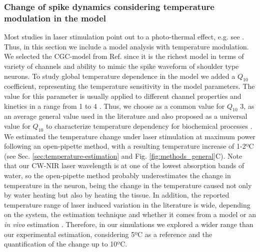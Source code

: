 \subsubsection{Change of spike dynamics considering temperature modulation in the model}
\label{sect:temperature model}
Most studies in laser stimulation point out to a photo-thermal effect, e.g. see \parencite{wells_biophysical_2007, shapiro_infrared_2012, li_temporal_2013, rabbitt_heat_2016, ganguly_modeling_2016, cury_infrared_2021, pan_infrared_2023}. Thus, in this section we include a model analysis with temperature modulation. We selected the CGC-model from Ref. \parencite{vavoulis_balanced_2010} since it is the richest model in terms of variety of channels and ability to mimic the spike waveform of shoulder type neurons. To study global temperature dependence in the model we added a $Q_{10}$ coefficient, representing the temperature sensitivity in the model parameters. The value for this parameter is usually applied to different channel properties and kinetics in a range from 1 to 4 \parencite{schauf_temperature_1973,cosens_temperature-dependence_1976,tang_precise_2010,alonso_temperature_2020}. 
Thus, we choose as a common value for $Q_{10}$ 3, as an average general value used in the literature \parencite{hodgkin_effect_1949,heitler_effect_1998,shapiro_infrared_2012, li_temporal_2013, rabbitt_heat_2016,ganguly_thermal_2019-1} and also proposed as a universal value for $Q_{10}$ to characterize temperature dependency for biochemical processes \parencite{elias_universality_2014}. We estimated the temperature change under laser stimulation at maximum power following an open-pipette method, with a resulting temperature increase of 1-2ºC (see Sec. \ref{sec:temperature-estimation} and Fig. \ref{fig:methods_general}C). Note that our CW-NIR laser wavelength is at one of the lowest absorption bands of water, so the open-pipette method probably underestimates the change in temperature in the neuron, being the change in the temperature caused not only by water heating but also by heating the tissue. In addition, the reported temperature range of laser induced variation in the literature is wide, depending on the system, the estimation technique and whether it comes from a model or an \textit{in vivo} estimation \parencite{shapiro_infrared_2012, rabbitt_heat_2016, thompson_modeling_2012}. Therefore, in our simulations we explored a wider range than our experimental estimation, considering 5ºC as a reference and the quantification of the change up to 10ºC.

